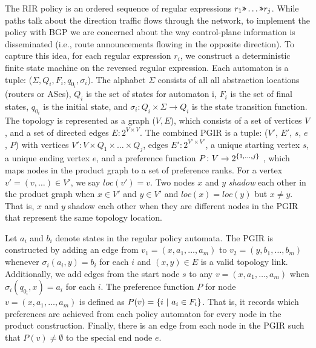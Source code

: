 

The RIR policy is an ordered sequence of regular expressions $r_1 \texttt{>>} \dots \texttt{>>} r_j$. While paths talk about the direction traffic flows through the network, to implement the policy with BGP we are concerned about the way control-plane information is disseminated (i.e., route announcements flowing in the opposite direction). To capture this idea, for each regular expression $r_i$, we construct a deterministic finite state machine on the reversed regular expression. Each automaton is a tuple: ($\Sigma, Q_i, F_i, q_{0_i}, \sigma_i$). The alphabet $\Sigma$ consists of all all abstraction locations (routers or ASes), $Q_i$ is the set of states for automaton i, $F_i$ is the set of final states, $q_{0_i}$ is the initial state, and $\sigma_i \colon Q_i \times \Sigma \rightarrow Q_i$ is the state transition function.
%
The topology is represented as a graph ($V, E$), which consists of a set of vertices $V$, and a set of directed edges $E \colon 2^{V \times V}$.
%
The combined PGIR is a tuple: ($V'$, $E'$, $s$, $e$, $P$) with
vertices $V' \colon V \times Q_1 \times \dots \times Q_j$,
edges $E' \colon 2^{V' \times V'}$,
a unique starting vertex $s$,
a unique ending vertex $e$,
and a preference function $P \colon V \rightarrow 2^{\{ 1, \dots, j \} }$ , which maps nodes in the product graph to a set of preference ranks.
For a vertex $v' = (v, \dots) \in V'$, we say $loc(v') = v$. 
Two nodes $x$ and $y$ \emph{shadow} each other in the product graph when $x \in V'$ and $y \in V'$ and $loc(x) = loc(y)$ but $x \neq y$. That is, $x$ and $y$ shadow each other when they are different nodes in the PGIR that represent the same topology location.


Let $a_i$ and $b_i$ denote states in the regular policy automata.
The PGIR is constructed by adding an edge from $v_1 = (x, a_1, \dots, a_m)$ to $v_2 = (y, b_1, \dots, b_m)$ whenever $\sigma_i(a_i, y) = b_i$ for each $i$ and $(x,y) \in E$ is a valid topology link.
%
Additionally, we add edges from the start node $s$ to any $v = (x, a_1, \dots, a_m)$ when $\sigma_i(q_{0_i}, x) = a_i$ for each $i$.
%
The preference function $P$ for node $v = (x, a_1, \dots, a_m)$ is defined as $P(v) = \{ i~\vert~a_i \in F_i \}  $. That is, it records which preferences are achieved from each policy automaton for every node in the product construction.
%
Finally, there is an edge from each node in the PGIR such that $P(v) \neq \emptyset$ to the special end node $e$.


